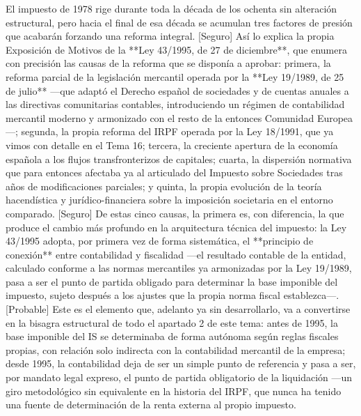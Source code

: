 \documentclass[10pt,a4paper]{article}
\begin{document}
El impuesto de 1978 rige durante toda la década de los ochenta sin alteración estructural, pero hacia el final de esa década se acumulan tres factores de presión que acabarán forzando una reforma integral. [Seguro] Así lo explica la propia Exposición de Motivos de la **Ley 43/1995, de 27 de diciembre**, que enumera con precisión las causas de la reforma que se disponía a aprobar: primera, la reforma parcial de la legislación mercantil operada por la **Ley 19/1989, de 25 de julio** —que adaptó el Derecho español de sociedades y de cuentas anuales a las directivas comunitarias contables, introduciendo un régimen de contabilidad mercantil moderno y armonizado con el resto de la entonces Comunidad Europea—; segunda, la propia reforma del IRPF operada por la Ley 18/1991, que ya vimos con detalle en el Tema 16; tercera, la creciente apertura de la economía española a los flujos transfronterizos de capitales; cuarta, la dispersión normativa que para entonces afectaba ya al articulado del Impuesto sobre Sociedades tras años de modificaciones parciales; y quinta, la propia evolución de la teoría hacendística y jurídico-financiera sobre la imposición societaria en el entorno comparado. [Seguro] De estas cinco causas, la primera es, con diferencia, la que produce el cambio más profundo en la arquitectura técnica del impuesto: la Ley 43/1995 adopta, por primera vez de forma sistemática, el **principio de conexión** entre contabilidad y fiscalidad —el resultado contable de la entidad, calculado conforme a las normas mercantiles ya armonizadas por la Ley 19/1989, pasa a ser el punto de partida obligado para determinar la base imponible del impuesto, sujeto después a los ajustes que la propia norma fiscal establezca—. [Probable] Este es el elemento que, adelanto ya sin desarrollarlo, va a convertirse en la bisagra estructural de todo el apartado 2 de este tema: antes de 1995, la base imponible del IS se determinaba de forma autónoma según reglas fiscales propias, con relación solo indirecta con la contabilidad mercantil de la empresa; desde 1995, la contabilidad deja de ser un simple punto de referencia y pasa a ser, por mandato legal expreso, el punto de partida obligatorio de la liquidación —un giro metodológico sin equivalente en la historia del IRPF, que nunca ha tenido una fuente de determinación de la renta externa al propio impuesto.
\end{document}
